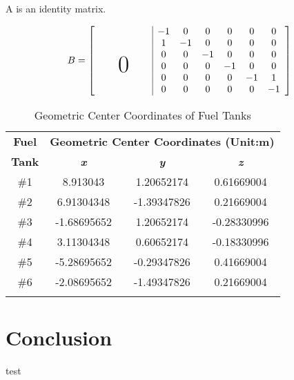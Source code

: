 \documentclass[english]{cccconf}
\begin{document}
A is an identity matrix.

\begin{equation}
B = 
\left[\begin{array}{cccccc|cccccc}
  & & & & & & -1 & 0 & 0 & 0 & 0 & 0 \\
  & & & & & & 1 & -1 & 0 & 0 & 0 & 0 \\
  & & & & & & 0 & 0 & -1 & 0 & 0 & 0 \\
  & & & & & & 0 & 0 & 0 & -1 & 0 & 0 \\
  \multicolumn{6}{c|}{\raisebox{2ex}[0pt]{\Huge0}} & 0 & 0 & 0 & 0 & -1 & 1 \\
  & & & & & & 0 & 0 & 0 & 0 & 0 & -1 \\
\end{array}\right]
\end{equation}

\begin{table}[htbp]
\label{tab:geometric_center}
\caption{Geometric Center Coordinates of Fuel Tanks}
\begin{center}
\begin{tabular}{c|c|c|c}
\hhline
\textbf{Fuel}&\multicolumn{3}{|c|}{\textbf{Geometric Center Coordinates (Unit:m)}} \\
\cline{2-4} 
\textbf{Tank} & \textbf{\textit{x}}& \textbf{\textit{y}}& \textbf{\textit{z}} \\
\hline
\#1 & 8.913043& 1.20652174 & 0.61669004\\%
\#2 & 6.91304348 & -1.39347826 & 0.21669004 \\
\#3 & -1.68695652 & 1.20652174 & -0.28330996 \\
\#4 & 3.11304348 & 0.60652174 & -0.18330996\\
\#5 & -5.28695652 & -0.29347826 & 0.41669004\\
\#6 & -2.08695652 & -1.49347826 & 0.21669004\\
\hhline
\end{tabular}
\label{Table:Geometric Center}
\end{center}
\end{table}


\section{Conclusion}\label{sec:conclusion}
test



\end{document}
